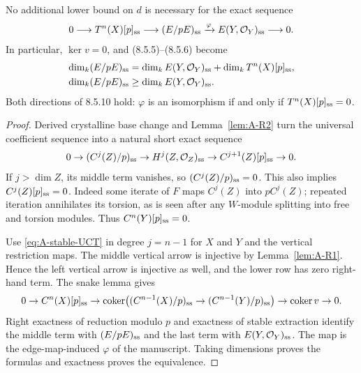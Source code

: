 \begin{theorem}\label{thm:A-exact85}
 No additional lower bound on $d$ is necessary for
the exact sequence
\begin{equation}\label{eq:A-exact85}
0\longrightarrow T^n(X)[p]_{\ss}
 \longrightarrow (E/pE)_{\ss}
 \xrightarrow{\varphi} E(Y,\OO_Y)_{\ss}
 \longrightarrow0.
\end{equation}
In particular, $\ker v=0$, and (8.5.5)--(8.5.6) become
\begin{align}
\dim_k(E/pE)_{\ss}
 &=\dim_k E(Y,\OO_Y)_{\ss}+\dim_k T^n(X)[p]_{\ss},\label{eq:A-dimension}\\
\dim_k(E/pE)_{\ss}&\geq\dim_k E(Y,\OO_Y)_{\ss}.
\end{align}
Both directions of 8.5.10 hold: $\varphi$ is an isomorphism if and
only if $T^n(X)[p]_{\ss}=0$.
\end{theorem}
\begin{proof}
Derived crystalline base change and Lemma~\ref{lem:A-R2} turn the
universal coefficient sequence into a natural short exact sequence
\begin{equation}\label{eq:A-stable-UCT}
0\to(C^j(Z)/p)_{\ss}\to H^j(Z,\OO_Z)_{\ss}
 \to C^{j+1}(Z)[p]_{\ss}\to0.
\end{equation}
If $j>\dim Z$, its middle term vanishes, so
$(C^j(Z)/p)_{\ss}=0$.  This also implies $C^j(Z)[p]_{\ss}=0$.
Indeed some iterate of $F$ maps $C^j(Z)$ into $pC^j(Z)$; repeated
iteration annihilates its torsion, as is seen after any $W$-module
splitting into free and torsion modules.  Thus $C^n(Y)[p]_{\ss}=0$.

Use \eqref{eq:A-stable-UCT} in degree $j=n-1$ for $X$ and $Y$ and
the vertical restriction maps.  The middle vertical arrow is injective
by Lemma~\ref{lem:A-R1}.  Hence the left vertical arrow is injective
as well, and the lower row has zero right-hand term.  The snake lemma
gives
\[
0\to C^n(X)[p]_{\ss}\to
 \coker\bigl((C^{n-1}(X)/p)_{\ss}\to(C^{n-1}(Y)/p)_{\ss}\bigr)
 \to\coker v\to0.
\]
Right exactness of reduction modulo $p$ and exactness of stable
extraction identify the middle term with $(E/pE)_{\ss}$ and the last
term with $E(Y,\OO_Y)_{\ss}$.  The map is the edge-map-induced
$\varphi$ of the manuscript.  Taking dimensions proves the formulas
and exactness proves the equivalence.
\end{proof}

